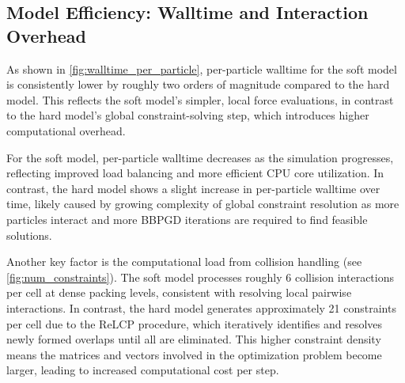 \documentclass[conference]{IEEEtran}
\begin{document}
\subsection{Model Efficiency: Walltime and Interaction Overhead}
\label{sec:complexity_scalability}

As shown in \autoref{fig:walltime_per_particle}, per-particle walltime for the soft model is consistently lower by roughly two orders of magnitude compared to the hard model. This reflects the soft model's simpler, local force evaluations, in contrast to the hard model's global constraint-solving step, which introduces higher computational overhead.

For the soft model, per-particle walltime decreases as the simulation progresses, reflecting improved load balancing and more efficient CPU core utilization. In contrast, the hard model shows a slight increase in per-particle walltime over time, likely caused by growing complexity of global constraint resolution as more particles interact and more BBPGD iterations are required to find feasible solutions.

Another key factor is the computational load from collision handling (see \autoref{fig:num_constraints}). The soft model processes roughly 6 collision interactions per cell at dense packing levels, consistent with resolving local pairwise interactions. In contrast, the hard model generates approximately 21 constraints per cell due to the ReLCP procedure, which iteratively identifies and resolves newly formed overlaps until all are eliminated. This higher constraint density means the matrices and vectors involved in the optimization problem become larger, leading to increased computational cost per step.
\end{document}
